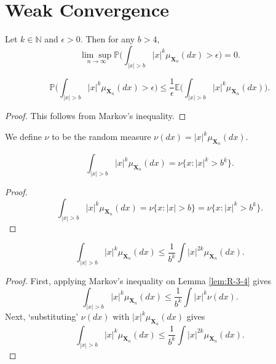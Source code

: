 \chapter{Weak Convergence}

\begin{lemma}
  \notready
  \label{lem:weak_convergence}
  Let $k \in \mathbb{N}$ and $\epsilon > 0$. Then for any $b > 4$,
  \[
  \underset{n \rightarrow \infty}{\lim \sup} \mathbb{P} \biggl( \int_{|x| > b} |x|^k \mu_{\mathbf{X}_n}(dx) > \epsilon \biggl) = 0.
  \]
\end{lemma}
\begin{lemma}[R-3-2 : lem:R-3-2]
  \notready
  \label{lem:R-3-2}
  \uses{}
  \[
  \mathbb{P} \biggl( \int_{|x| > b} |x|^k \mu_{\mathbf{X}_n}(dx) > \epsilon \biggl) \leq \frac{1}{\epsilon} \mathbb{E} \biggl( \int_{|x| > b} |x|^k \mu_{\mathbf{X}_n}(dx) \biggl).
  \]
\end{lemma}
\begin{proof}
  This follows from Markov's inequality.
\end{proof}
\begin{definition}[R-3-3 : def:R-3-3]
  \notready
  \label{def:R-3-3}
  \uses{} %
  We define $\nu$ to be the random measure $\nu(dx) = |x|^k \mu_{\mathbf{X}_n}(dx)$.
\end{definition}
\begin{lemma}[R-3-4 : lem:R-3-4]
  \notready
  \label{lem:R-3-4}
  \[
  \int_{|x| > b} |x|^k \mu_{\mathbf{X}_n}(dx) = \nu\{x : |x|^k > b^k\}.
  \]
\end{lemma}
\begin{proof}
  \[
  \int_{|x| > b} |x|^k \mu_{\mathbf{X}_n}(dx) = \nu\{x : |x| > b\} = \nu\{x : |x|^k > b^k\}.
  \]
\end{proof}
\begin{lemma}[R-3-5 : lem:R-3-5]
  \notready
  \label{lem:R-3-5}
  \[
  \int_{|x| > b} |x|^k \mu_{\mathbf{X}_n}(dx) \leq \frac{1}{b^k} \int |x|^{2k} \mu_{\mathbf{X}_n}(dx).
  \]
\end{lemma}
\begin{proof}
  First, applying Markov's inequality on Lemma \ref{lem:R-3-4} gives
  \[
  \int_{|x| > b} |x|^k \mu_{\mathbf{X}_n}(dx) \leq \frac{1}{b^k} \int |x|^k \nu(dx).
  \] 
  Next, `substituting' $\nu(dx)$ with $|x|^k \mu_{\mathbf{X}_n}(dx)$ gives
  \[
  \int_{|x| > b} |x|^k \mu_{\mathbf{X}_n}(dx) \leq \frac{1}{b^k} \int |x|^{2k} \mu_{\mathbf{X}_n}(dx).
  \] 
\end{proof}
